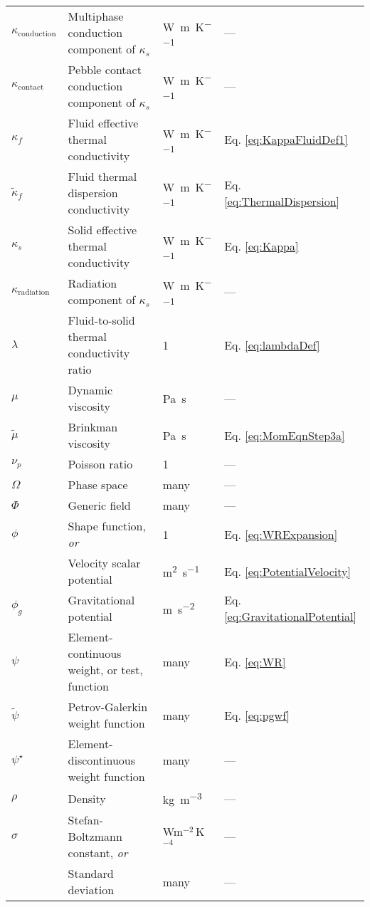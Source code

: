 \begin{longtable}{p{2cm}p{9cm}p{2cm}p{5cm}}
\(\kappa_\text{conduction}\) & Multiphase conduction component of \(\kappa_s\) & \si{\watt\per\meter\per\kelvin} & ---\\
\(\kappa_\text{contact}\) & Pebble contact conduction component of \(\kappa_s\) & \si{\watt\per\meter\per\kelvin} & ---\\
\(\kappa_f\) & Fluid effective thermal conductivity & \si{\watt\per\meter\per\kelvin} & Eq. \eqref{eq:KappaFluidDef1}\\
\(\tilde{\kappa}_f\) & Fluid thermal dispersion conductivity & \si{\watt\per\meter\per\kelvin} & Eq. \eqref{eq:ThermalDispersion}\\
\(\kappa_s\) & Solid effective thermal conductivity & \si{\watt\per\meter\per\kelvin} & Eq. \eqref{eq:Kappa}\\
\(\kappa_\text{radiation}\) & Radiation component of \(\kappa_s\) & \si{\watt\per\meter\per\kelvin} & ---\\
\(\lambda\) & Fluid-to-solid thermal conductivity ratio & 1 & Eq. \eqref{eq:lambdaDef}\\
\(\mu\) & Dynamic viscosity & \si{\pascal\second} & ---\\
\(\tilde{\mu}\) & Brinkman viscosity & \si{\pascal\second} & Eq. \eqref{eq:MomEqnStep3a}\\
\(\nu_p\) & Poisson ratio & 1 & ---\\
\(\Omega\) & Phase space & many & ---\\
\(\Phi\) & Generic field & many & ---\\
\(\phi\) & Shape function, \textit{or} & 1 & Eq. \eqref{eq:WRExpansion}\\
& Velocity scalar potential & \si{\square\meter\per\second} & Eq. \eqref{eq:PotentialVelocity}\\
\(\phi_g\) & Gravitational potential & \si{\meter\per\square\second} & Eq. \eqref{eq:GravitationalPotential}\\
\(\psi\) & Element-continuous weight, or test, function & many & Eq. \eqref{eq:WR}\\
\(\tilde{\psi}\) & Petrov-Galerkin weight function & many & Eq. \eqref{eq:pgwf}\\
\(\psi^\star\) & Element-discontinuous weight function & many & ---\\
\(\rho\) & Density & \si{\kilo\gram\per\cubic\meter} & ---\\
\(\sigma\) & Stefan-Boltzmann constant, \textit{or} & Wm$^{-2\ }$K$^{-4}$ & ---\\ 
& Standard deviation & many & ---\\

\end{longtable}
